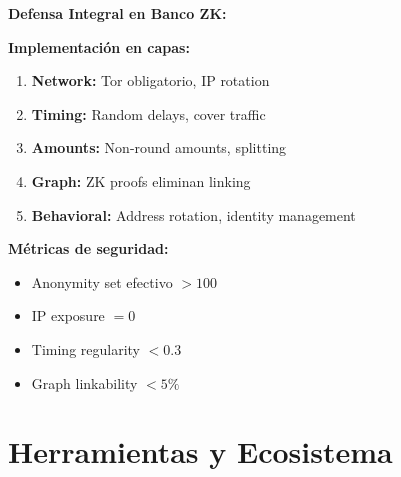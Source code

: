 \documentclass[11pt,a4paper,twoside]{book}
\theoremstyle{definition}
\theoremstyle{remark}
\renewcommand{\cleardoublepage}{\clearpage}
\begin{document}
\begin{bancozk}
\textbf{Defensa Integral en Banco ZK:}

\begin{center}
\end{center}

\textbf{Implementación en capas:}
\begin{enumerate}
    \item \textbf{Network:} Tor obligatorio, IP rotation
    \item \textbf{Timing:} Random delays, cover traffic
    \item \textbf{Amounts:} Non-round amounts, splitting
    \item \textbf{Graph:} ZK proofs eliminan linking
    \item \textbf{Behavioral:} Address rotation, identity management
\end{enumerate}

\textbf{Métricas de seguridad:}
\begin{itemize}
    \item Anonymity set efectivo $> 100$
    \item IP exposure $= 0$
    \item Timing regularity $< 0.3$
    \item Graph linkability $< 5\%$
\end{itemize}
\end{bancozk}

\cleardoublepage




\part{Herramientas y Ecosistema}

\end{document}
